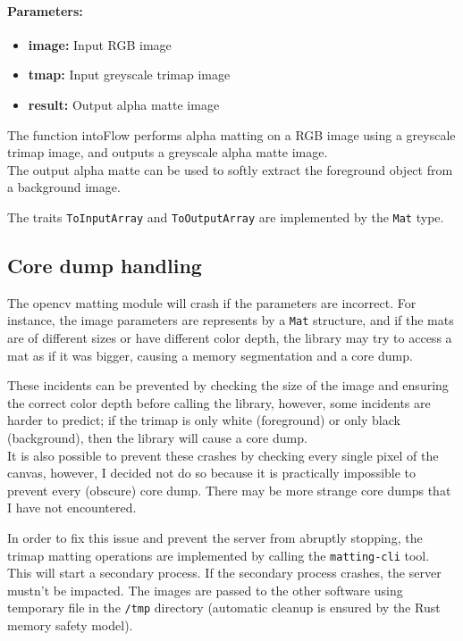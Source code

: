 \documentclass[a4paper]{article}
\begin{document}
\paragraph{Parameters:}
\begin{itemize}
    \item \textbf{image:} Input RGB image
    \item \textbf{tmap:} Input greyscale trimap image
    \item \textbf{result:} Output alpha matte image
\end{itemize}

The function intoFlow performs alpha matting on a RGB image
using a greyscale trimap image, and outputs a greyscale alpha matte image. \\
The output alpha matte can be used to softly extract the foreground
object from a background image. %

The \gls{trait}s \texttt{ToInputArray} and \texttt{ToOutputArray}
are implemented by the \texttt{Mat} type.

\pagebreak

\subsection{Core dump handling}

The opencv matting module will crash if the parameters
are incorrect. For instance, the image parameters are represents by a
\texttt{Mat} structure, and if the mats are of different sizes or have different color depth,
the library may try to access a mat as if it was bigger, causing a memory segmentation
and a core dump.

These incidents can be prevented by checking the size of the image and ensuring the correct
color depth before calling the library, however, some incidents are harder
to predict; if the trimap is only white (foreground) or only black (background),
then the library will cause a core dump. \\
It is also possible to prevent these crashes by checking every single pixel
of the canvas, however, I decided not do so because it is practically impossible
to prevent every (obscure) core dump. There may be more strange core dumps
that I have not encountered.

In order to fix this issue and prevent the server from abruptly stopping,
the trimap matting operations are implemented by calling the \texttt{matting-cli}
tool. This will start a secondary process. If the secondary process crashes,
the server mustn't be impacted. The images are passed to the other software using
temporary file in the \texttt{/tmp} directory (automatic cleanup
is ensured by the Rust memory safety model).
\end{document}
